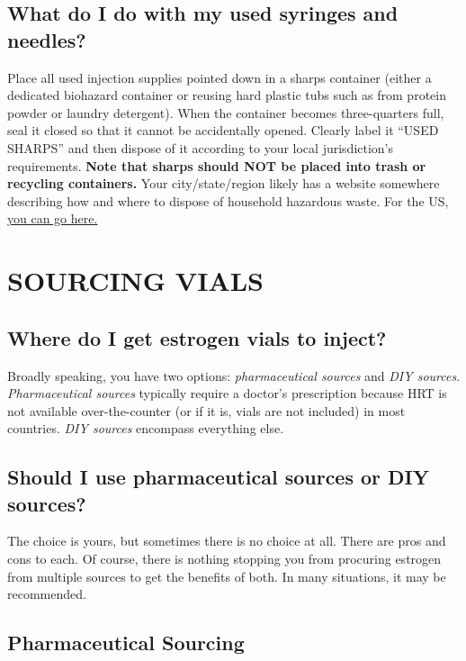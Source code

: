 \documentclass{article}
\begin{document}
\subsection{What do I do with my used syringes and needles?}\label{5-27}

Place all used injection supplies pointed down in a sharps container (either a dedicated biohazard container or reusing hard plastic tubs such as from protein powder or laundry detergent). When the container becomes three-quarters full, seal it closed so that it cannot be accidentally opened. Clearly label it “USED SHARPS” and then dispose of it according to your local jurisdiction's requirements. \textbf{Note that sharps should NOT be placed into trash or recycling containers.} Your city/state/region likely has a website somewhere describing how and where to dispose of household hazardous waste. For the US, \href{https://safeneedledisposal.org/}{you can go here.}



\section{SOURCING VIALS}\label{sv}

\subsection{Where do I get estrogen vials to inject?}

Broadly speaking, you have two options: \textit{pharmaceutical sources} and \textit{DIY sources}. \textit{Pharmaceutical sources} typically require a doctor's prescription because HRT is not available over-the-counter (or if it is, vials are not included) in most countries. \textit{DIY sources} encompass everything else.

\subsection{Should I use pharmaceutical sources or DIY sources?}

The choice is yours, but sometimes there is no choice at all. There are pros and cons to each. Of course, there is nothing stopping you from procuring estrogen from multiple sources to get the benefits of both. In many situations, it may be recommended.

\subsection*{Pharmaceutical Sourcing}
\end{document}
